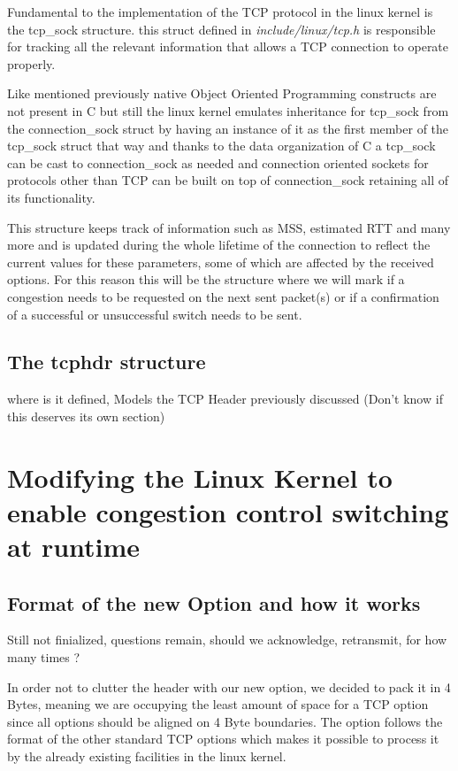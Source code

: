 \documentclass[type=bsc,accentcolor=tud9a,colorback,11pt,paper=a4report]{tudthesis}
\begin{document}
Fundamental to the implementation of the TCP protocol in the linux kernel is 
the tcp\_sock structure. this struct defined in \emph{include/linux/tcp.h} is 
responsible for tracking all the relevant information that allows a TCP 
connection to operate properly. 

Like mentioned previously native Object Oriented Programming constructs 
are not present in C but still the linux kernel emulates inheritance for 
tcp\_sock from the connection\_sock struct by having an instance of it as the 
first member of the tcp\_sock struct that way and thanks to the data 
organization of C 
a tcp\_sock can be cast to connection\_sock as needed and connection oriented 
sockets for protocols other than TCP can be built on top of connection\_sock
retaining all of its functionality.

This structure keeps track of information such as MSS, estimated RTT and many
more and is updated during the whole lifetime of the connection to reflect the 
current values for these parameters, some of which are affected by the received 
options. For this reason this will be the structure where we will mark if a 
congestion needs to be requested on the next sent packet(s) or if a confirmation
of a successful or unsuccessful switch needs to be sent.
	\section{The tcphdr structure}
where is it defined, Models the TCP Header previously discussed 
(Don't know if this deserves its own section)
\chapter{Modifying the Linux Kernel to enable congestion control switching at runtime}
	\section{Format of the new Option and how it works}
Still not finialized, questions remain, should we acknowledge, retransmit, for how many times ?

In order not to clutter the header with our new option, we decided to pack it in 
4 Bytes, meaning we are occupying the least amount of space for a TCP
option since all options should be aligned on 4 Byte boundaries. 
The option follows the format of the other standard TCP options which 
makes it possible to process it by the already existing facilities in the linux 
kernel.
\end{document}
